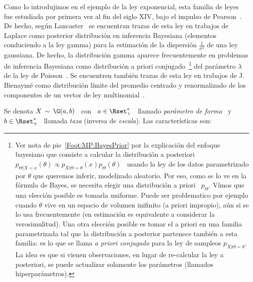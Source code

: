 \label{Sssec:MP:Gamma}

Como lo introdujimos en el ejemplo  de la ley exponencial, esta familia de leyes
fue  estudiada  por primera  vez  al  fin del  siglo  XIV,  bajo  el impulso  de
Pearson~\cite{Pea95}.   De hecho,  seg\'un Lancaster~\cite{Lan66}  se encuentran
trazas  de esta  ley en  trabajos de  Laplace como  posterior  distribuci\'on en
inferencia Bayesiana (elementos conduciendo a la ley gamma) para la estimaci\'on
de  la dispersi\'on  $\frac1{\sigma^2}$  de  una ley  gaussiana.   De hecho,  la
distribuci\'on gamma aparece frecuentemente en problemas de inferencia Bayesiana
como    distribuci\'on     a    priori    conjugado~\footnote{Ver     nota    de
  pie~\ref{Foot:MP:BayesPrior}  por la explicaci\'on  del enfoque  bayesiano que
  consiste  a calcular  la distribuci\'on  a  posteriori $p_{\Theta|X=x}(\theta)
  \propto p_{X|\Theta=\theta}(x) p_\Theta(\theta)$ \  usando la ley de los datos
  parametrizado  por $\theta$  que queremos  inferir, modelizado  aleatorio. Por
  eso,  como  se  lo ve  en  la  f\'ormula  de  Bayes,  se necesita  elegir  una
  distribuci\'on a priori  \ $p_\Theta$.  V\'imos que una  elecci\'on posible es
  tomarla uniforme. Puede  ser problematico por ejemplo cuando  $\theta$ vive en
  un  espacio de  volumen inifinito  (a  priori impropio),  a\'un si  se lo  usa
  frecuentemente (en estimaci\'on es equivalente a considerar la verosimulitud).
  Una otra elecci\'on posible es tomar  el a priori en una familia parametrizada
  tal que la  distribuci\'on a posterior partenece tambi\'en  a esta familia: es
  lo que se llama {\em a  priori conjugado} para la ley de sampleos $p_{X|\Theta
    = \theta}$. La idea es que  si vienen observaciones, en lugar de re-calcular
  la ley a posteriori, se  puede actualizar solamente los par\'ametros (llamados
  hiperpar\'ametros).\label{Foot:MP:BayesPriorConjugado}}     del    par\'ametro
$\lambda$ de la  ley de Poisson~\cite{Rob07}. Se encuentren  tambi\'en trazas de
esta ley en trabajos de J.  Bienaym\'e como distribuci\'on l\'imite del promedio
centrado   y  renormalizado   de   los   componentes  de   un   vector  de   ley
multinomial~\cite{Bie38, Lan66}.

Se  denota $X \,  \sim \,  \G(a,b)$ \  con \  $a \in  \Rset_+^*$ \  llamado {\em
par\'ametro de  forma} \ y \  $b \in \Rset_+^*$  \ llamada {\em taza}  (inversa de
{\em escala}). Las caracter\'isticas son:

